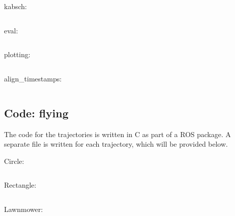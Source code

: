 \documentclass[12pt,a4paper]{article}
\begin{document}
  \noindent
  kabsch: 
  \inputminted{python}{../quad/kabsch.py}

  \noindent
  eval: 
  \inputminted{python}{../quad/eval.py}


  \noindent
  plotting: 
  \inputminted{python}{../quad/plotting.py}

  \noindent
  align\_timestamps: 
  \inputminted{python}{../quad/align_timestamps.py}


  \subsection{Code: flying}
    \label{a: code flying}
    The code for the trajectories is written in C as part of a ROS package. A separate file is written for each trajectory, which will be provided below.

    \noindent
    Circle:
    \inputminted{cpp}{../trj_code/circle/vicon_test.cpp}
    
    \noindent
    Rectangle:
    \inputminted{cpp}{../trj_code/rectangle/vicon_test.cpp}

    \noindent
    Lawnmower:
    \inputminted{cpp}{../trj_code/lawnmower/vicon_test.cpp}
\end{document}
